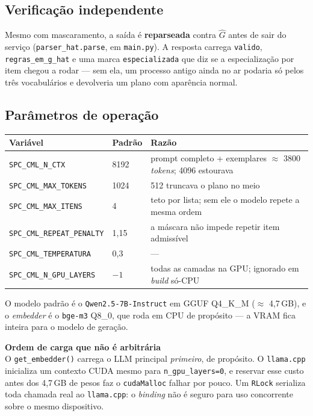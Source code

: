 \documentclass[11pt,a4paper]{article}
\newcommand{\aviso}[2]{%
  \begin{center}
  \begin{minipage}{0.95\linewidth}
  \setlength{\fboxsep}{8pt}%
  \colorbox{corAlertaFundo}{%
    \begin{minipage}{\dimexpr\linewidth-16pt\relax}
    \textbf{\textcolor{corAlerta}{#1}}\\[2pt]#2
    \end{minipage}}
  \end{minipage}
  \end{center}
}
\newcommand{\arq}[1]{\texttt{\small #1}}
\begin{document}
\subsection{Verificação independente}

Mesmo com mascaramento, a saída é \textbf{reparseada} contra $\hat{G}$ antes de
sair do serviço (\texttt{parser\_hat.parse}, em \arq{main.py}). A resposta
carrega \texttt{valido}, \texttt{regras\_em\_g\_hat} e uma marca
\texttt{especializada} que diz se a especialização por item chegou a rodar ---
sem ela, um processo antigo ainda no ar podaria só pelos três vocabulários e
devolveria um plano com aparência normal.

\subsection{Parâmetros de operação}

\begin{center}
\small
\begin{tabular}{@{}lll@{}}
\toprule
\textbf{Variável} & \textbf{Padrão} & \textbf{Razão}\\
\midrule
\texttt{SPC\_CML\_N\_CTX}          & 8192   & prompt completo + exemplares $\approx$ 3800 \emph{tokens}; 4096 estourava\\
\texttt{SPC\_CML\_MAX\_TOKENS}     & 1024   & 512 truncava o plano no meio\\
\texttt{SPC\_CML\_MAX\_ITENS}      & 4      & teto por lista; sem ele o modelo repete a mesma ordem\\
\texttt{SPC\_CML\_REPEAT\_PENALTY} & 1{,}15 & a máscara não impede repetir item admissível\\
\texttt{SPC\_CML\_TEMPERATURA}     & 0{,}3  & ---\\
\texttt{SPC\_CML\_N\_GPU\_LAYERS}  & $-1$   & todas as camadas na GPU; ignorado em \emph{build} só-CPU\\
\bottomrule
\end{tabular}
\end{center}

\vspace{2mm}

O modelo padrão é o \texttt{Qwen2.5-7B-Instruct} em GGUF Q4\_K\_M
($\approx$ 4{,}7\,GB), e o \emph{embedder} é o \texttt{bge-m3} Q8\_0, que roda em
CPU de propósito --- a VRAM fica inteira para o modelo de geração.

\aviso{Ordem de carga que não é arbitrária}{%
O \texttt{get\_embedder()} carrega o LLM principal \emph{primeiro}, de propósito.
O \texttt{llama.cpp} inicializa um contexto CUDA mesmo para
\texttt{n\_gpu\_layers=0}, e reservar esse custo antes dos 4{,}7\,GB de pesos
faz o \texttt{cudaMalloc} falhar por pouco. Um \texttt{RLock} serializa toda
chamada real ao \texttt{llama.cpp}: o \emph{binding} não é seguro para uso
concorrente sobre o mesmo dispositivo.}
\end{document}
